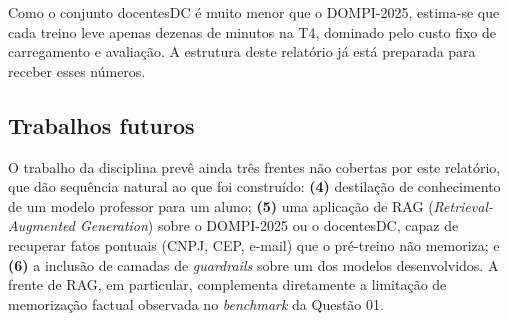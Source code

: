 Como o conjunto docentesDC é muito menor que o DOMPI-2025, estima-se que cada treino
leve apenas dezenas de minutos na T4, dominado pelo custo fixo de carregamento e
avaliação. A estrutura deste relatório já está preparada para receber esses números.

\subsection{Trabalhos futuros}

O trabalho da disciplina prevê ainda três frentes não cobertas por este relatório,
que dão sequência natural ao que foi construído: \textbf{(4)} destilação de
conhecimento de um modelo professor para um aluno; \textbf{(5)} uma aplicação de RAG
(\textit{Retrieval-Augmented Generation}) sobre o DOMPI-2025 ou o docentesDC, capaz
de recuperar fatos pontuais (CNPJ, CEP, e-mail) que o pré-treino não memoriza; e
\textbf{(6)} a inclusão de camadas de \textit{guardrails} sobre um dos modelos
desenvolvidos. A frente de RAG, em particular, complementa diretamente a limitação de
memorização factual observada no \textit{benchmark} da Questão 01.
